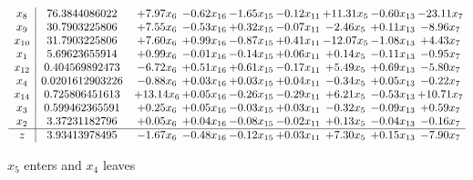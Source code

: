 \documentclass[9pt]{article}
\begin{document}
 \[\begin{array}{c| c c@{\hskip 2pt} c@{\hskip 2pt} c@{\hskip 2pt} c@{\hskip 2pt} c@{\hskip 2pt} c@{\hskip 2pt} c@{\hskip 2pt} }
 x_{8}   &  76.3844086022 & +  7.97 x_{6} & -0.62 x_{16} & -1.65 x_{15} & -0.12 x_{11} & + 11.31 x_{5} & -0.60 x_{13} & -23.11 x_{7}\\
 x_{9}   &  30.7903225806 & +  7.55 x_{6} & -0.53 x_{16} & +  0.32 x_{15} & -0.07 x_{11} & -2.46 x_{5} & +  0.11 x_{13} & -8.96 x_{7}\\
 x_{10}   &  31.7903225806 & +  7.60 x_{6} & +  0.99 x_{16} & -0.87 x_{15} & +  0.41 x_{11} & -12.07 x_{5} & -1.08 x_{13} & +  4.43 x_{7}\\
 x_{1}   &  5.69623655914 & +  0.99 x_{6} & -0.01 x_{16} & -0.14 x_{15} & +  0.06 x_{11} & +  0.14 x_{5} & -0.11 x_{13} & -0.95 x_{7}\\
 x_{12}   &  0.404569892473 & -6.72 x_{6} & +  0.51 x_{16} & +  0.61 x_{15} & -0.17 x_{11} & +  5.49 x_{5} & +  0.69 x_{13} & -5.80 x_{7}\\
 x_{4}   &  0.0201612903226 & -0.88 x_{6} & +  0.03 x_{16} & +  0.03 x_{15} & +  0.04 x_{11} & -0.34 x_{5} & +  0.05 x_{13} & -0.22 x_{7}\\
 x_{14}   &  0.725806451613 & + 13.14 x_{6} & +  0.05 x_{16} & -0.26 x_{15} & -0.29 x_{11} & +  6.21 x_{5} & -0.53 x_{13} & + 10.71 x_{7}\\
 x_{3}   &  0.599462365591 & +  0.25 x_{6} & +  0.05 x_{16} & -0.03 x_{15} & +  0.03 x_{11} & -0.32 x_{5} & -0.09 x_{13} & +  0.59 x_{7}\\
 x_{2}   &  3.37231182796 & +  0.05 x_{6} & +  0.04 x_{16} & -0.08 x_{15} & -0.02 x_{11} & +  0.13 x_{5} & -0.04 x_{13} & -0.16 x_{7}\\
\hline
z    &  3.93413978495 & -1.67 x_{6} & -0.48 x_{16} & -0.12 x_{15} & +  0.03 x_{11} & +  7.30 x_{5} & +  0.15 x_{13} & -7.90 x_{7}\\
\end{array}\]


 $ x_{5} $ enters and $ x_{4} $ leaves 
\end{document}
